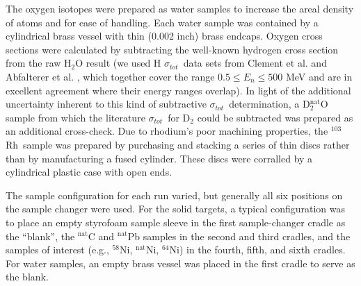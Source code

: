 \documentclass[twocolumn,secnumarabic,amssymb, nobibnotes, aps, prl,
superscriptaddress, nobalancelastpage]{revtex4}
\newcommand{\tot}{\ensuremath{\sigma_{tot}}}
\newcommand{\rhThree}{\ensuremath{^{103}}R\lowercase{h}}
\begin{document}
%
%
%
%

The oxygen isotopes were prepared as water samples to increase the areal density
of atoms and for ease of handling. Each water sample was contained by a
cylindrical brass vessel with thin (0.002 inch) brass endcaps. Oxygen cross sections were calculated by
subtracting the well-known hydrogen cross section from the raw H$_{2}$O result
(we used H \tot\  data sets from Clement et al. \cite{Clement1972} and Abfalterer
et al. \cite{Abfalterer2001}, which together cover the range $0.5 \leq E_n \leq 500$ MeV
and are in excellent agreement where their energy ranges overlap). In light of
the additional uncertainty inherent to this kind of subtractive \tot\ determination,
a D$_{2}^{\text{nat}}$O sample from which the literature \tot\  for
D$_{2}$ could be subtracted was prepared as an additional cross-check. Due to
rhodium's poor machining properties, the \rhThree\ sample
was prepared by purchasing and stacking a series of thin discs rather than by
manufacturing a fused cylinder. These discs were corralled
by a cylindrical plastic case with open ends.

The sample configuration for each run varied, but generally all six positions on
the sample changer were used. For the solid targets, a typical configuration was
to place an empty styrofoam sample sleeve in the first sample-changer cradle as
the ``blank'', the $^{\text{nat}}$C and $^{\text{nat}}$Pb samples in the second and third
cradles, and the samples of interest (e.g., $^{58}$Ni, $^{\text{nat}}$Ni, $^{64}$Ni) in
the fourth, fifth, and sixth cradles. For water samples, an empty brass vessel
was placed in the first cradle to serve as the blank.
\end{document}
